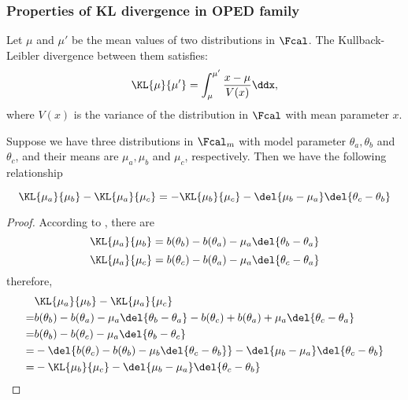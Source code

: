 \subsubsection{Properties of KL divergence in OPED family}
\begin{lemma}\citep{Harremo_s_2017} \label{lemma:exp-KL-eq}
    Let $\mu$ and $\mu'$ be the mean values of two distributions in $\Fcal$. The Kullback-Leibler divergence between them satisfies:
        \[
            \KL{\mu}{\mu'} = \int_{\mu}^{\mu'} \frac{x-\mu}{V(x)} \ddx
            ,
        \]
    where $V(x)$ is the variance of the distribution in $\Fcal$ with mean parameter $x$.
\end{lemma}

    \begin{lemma} \label{lemma:Bregman-equation}
        Suppose we have three distributions
        in $\Fcal_m$
        with model parameter $\theta_a, \theta_b$ and $\theta_c$, and their means are $\mu_a, \mu_b$ and $\mu_c$, respectively. Then we have the following relationship

        \[
            \KL{\mu_a}{\mu_b} - \KL{\mu_a}{\mu_c} = 
            - \KL{\mu_b}{\mu_c} - \del{ \mu_b - \mu_a } \del{ \theta_c - \theta_b }
        \]
    \end{lemma}
    \begin{proof}
        According to , there are
        \[
            \KL{\mu_a}{\mu_b} = b(\theta_b) - b(\theta_a) - \mu_a \del{ \theta_b - \theta_a }
        \]
        \[
            \KL{\mu_a}{\mu_c} = b(\theta_c) - b(\theta_a) - \mu_a \del{ \theta_c - \theta_a }
        \]
        therefore, 
        \begin{align*}
            &
                \KL{\mu_a}{\mu_b} - \KL{\mu_a}{\mu_c}
            \\
            =&
                b(\theta_b) - b(\theta_a) - \mu_a \del{ \theta_b - \theta_a } - b(\theta_c) + b(\theta_a) + \mu_a \del{ \theta_c - \theta_a }
            \\
            =&
                b(\theta_b) - b(\theta_c)  - \mu_a \del{ \theta_b - \theta_c }
            \\
            =&
                - \del{ b(\theta_c) - b(\theta_b) - \mu_b \del{ \theta_c - \theta_b } } - \del{ \mu_b - \mu_a } \del{ \theta_c - \theta_b }
            \\
            =&
                - \KL{\mu_b}{\mu_c} - \del{ \mu_b - \mu_a } \del{ \theta_c - \theta_b }
        \end{align*}
    \end{proof}
    


